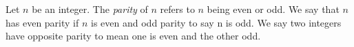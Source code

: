 \guard




\begin{defn}
\label{defn:parity}
  Let $n$ be an integer.
  The \emph{parity} of $n$ refers to $n$ being even or odd.
  We say that $n$ has even parity if $n$ is even and odd parity to say n is odd.
  We say two integers have opposite parity to mean one is even and the other odd.
\end{defn}
